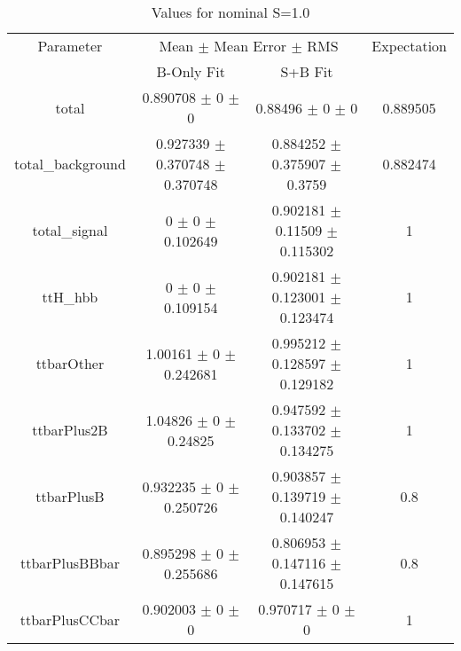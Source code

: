 \begin{table}
\centering
\caption{Values for nominal S=1.0}
\begin{tabular}{cccc}
\toprule
Parameter & \multicolumn{2}{c}{Mean $\pm$ Mean Error $\pm$ RMS} & Expectation\\
 & B-Only Fit & S+B Fit & \\
\midrule
total & \num{0.890708} $\pm$ \num{0} $\pm$ \num{0} & \num{0.88496} $\pm$ \num{0} $\pm$ \num{0} & \num{0.889505}\\
total\_background & \num{0.927339} $\pm$ \num{0.370748} $\pm$ \num{0.370748} & \num{0.884252} $\pm$ \num{0.375907} $\pm$ \num{0.3759} & \num{0.882474}\\
total\_signal & \num{0} $\pm$ \num{0} $\pm$ \num{0.102649} & \num{0.902181} $\pm$ \num{0.11509} $\pm$ \num{0.115302} & \num{1}\\
ttH\_hbb & \num{0} $\pm$ \num{0} $\pm$ \num{0.109154} & \num{0.902181} $\pm$ \num{0.123001} $\pm$ \num{0.123474} & \num{1}\\
ttbarOther & \num{1.00161} $\pm$ \num{0} $\pm$ \num{0.242681} & \num{0.995212} $\pm$ \num{0.128597} $\pm$ \num{0.129182} & \num{1}\\
ttbarPlus2B & \num{1.04826} $\pm$ \num{0} $\pm$ \num{0.24825} & \num{0.947592} $\pm$ \num{0.133702} $\pm$ \num{0.134275} & \num{1}\\
ttbarPlusB & \num{0.932235} $\pm$ \num{0} $\pm$ \num{0.250726} & \num{0.903857} $\pm$ \num{0.139719} $\pm$ \num{0.140247} & \num{0.8}\\
ttbarPlusBBbar & \num{0.895298} $\pm$ \num{0} $\pm$ \num{0.255686} & \num{0.806953} $\pm$ \num{0.147116} $\pm$ \num{0.147615} & \num{0.8}\\
ttbarPlusCCbar & \num{0.902003} $\pm$ \num{0} $\pm$ \num{0} & \num{0.970717} $\pm$ \num{0} $\pm$ \num{0} & \num{1}\\
\bottomrule
\end{tabular}
\end{table}